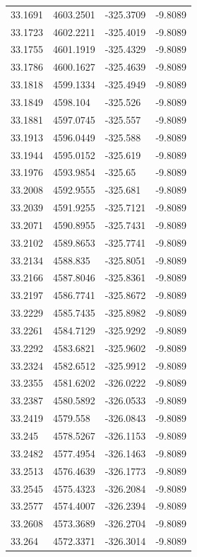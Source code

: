 \begin{table}[H]
\begin{tabular}{llll}
33.1691 & 4603.2501 & -325.3709 & -9.8089 \\
33.1723 & 4602.2211 & -325.4019 & -9.8089 \\
33.1755 & 4601.1919 & -325.4329 & -9.8089 \\
33.1786 & 4600.1627 & -325.4639 & -9.8089 \\
33.1818 & 4599.1334 & -325.4949 & -9.8089 \\
33.1849 & 4598.104 & -325.526 & -9.8089 \\
33.1881 & 4597.0745 & -325.557 & -9.8089 \\
33.1913 & 4596.0449 & -325.588 & -9.8089 \\
33.1944 & 4595.0152 & -325.619 & -9.8089 \\
33.1976 & 4593.9854 & -325.65 & -9.8089 \\
33.2008 & 4592.9555 & -325.681 & -9.8089 \\
33.2039 & 4591.9255 & -325.7121 & -9.8089 \\
33.2071 & 4590.8955 & -325.7431 & -9.8089 \\
33.2102 & 4589.8653 & -325.7741 & -9.8089 \\
33.2134 & 4588.835 & -325.8051 & -9.8089 \\
33.2166 & 4587.8046 & -325.8361 & -9.8089 \\
33.2197 & 4586.7741 & -325.8672 & -9.8089 \\
33.2229 & 4585.7435 & -325.8982 & -9.8089 \\
33.2261 & 4584.7129 & -325.9292 & -9.8089 \\
33.2292 & 4583.6821 & -325.9602 & -9.8089 \\
33.2324 & 4582.6512 & -325.9912 & -9.8089 \\
33.2355 & 4581.6202 & -326.0222 & -9.8089 \\
33.2387 & 4580.5892 & -326.0533 & -9.8089 \\
33.2419 & 4579.558 & -326.0843 & -9.8089 \\
33.245 & 4578.5267 & -326.1153 & -9.8089 \\
33.2482 & 4577.4954 & -326.1463 & -9.8089 \\
33.2513 & 4576.4639 & -326.1773 & -9.8089 \\
33.2545 & 4575.4323 & -326.2084 & -9.8089 \\
33.2577 & 4574.4007 & -326.2394 & -9.8089 \\
33.2608 & 4573.3689 & -326.2704 & -9.8089 \\
33.264 & 4572.3371 & -326.3014 & -9.8089 \\

\end{tabular}
\end{table}
